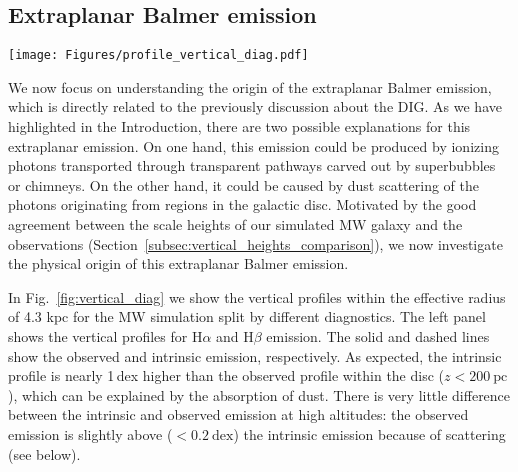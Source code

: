 \documentclass[fleqn,usenatbib]{mnras}
\begin{document}
\subsection{Extraplanar Balmer emission}
\label{subec:vertical_analysis}

\begin{figure*}
\begin{center}
\texttt{[image: Figures/profile\_vertical\_diag.pdf]}
\caption{Extraplanar Balmer emission of the MW simulation. From left to right, the vertical profiles of H$\alpha$ and H$\beta$, of H$\alpha$ split by DIG and  photons, of H$\alpha$ split by scattered and non-scattered photons, and H$\alpha$ split by radiative recombination and collisional excitation. The smaller panels on the bottom show the fractional contribution of the different components. All the vertical profiles are obtained within the effective radius of 4.3 kpc. The key message from this figure is that the Balmer emission at large scale heights ($z>200~\mathrm{pc}$) is mainly emitted in-situ via radiative recombination, emitted in low-density gas (i.e. the DIG), and scattering is significant but not dominant ($f_{\rm scat}\approx 20\%$).}
\label{fig:vertical_diag}
\end{center}
\end{figure*}

We now focus on understanding the origin of the extraplanar Balmer emission, which is directly related to the previously discussion about the DIG. As we have highlighted in the Introduction, there are two possible explanations for this extraplanar emission. On one hand, this emission could be produced by ionizing photons transported through transparent pathways carved out by superbubbles or chimneys. On the other hand, it could be caused by dust scattering of the photons originating from  regions in the galactic disc. Motivated by the good agreement between the scale heights of our simulated MW galaxy and the observations (Section~\ref{subsec:vertical_heights_comparison}), we now investigate the physical origin of this extraplanar Balmer emission.

In Fig.~\ref{fig:vertical_diag} we show the vertical profiles within the effective radius of 4.3 kpc for the MW simulation split by different diagnostics. The left panel shows the vertical profiles for H$\alpha$ and H$\beta$ emission. The solid and dashed lines show the observed and intrinsic emission, respectively. As expected, the intrinsic profile is nearly 1\,dex higher than the observed profile within the disc ($z<200~\mathrm{pc}$), which can be explained by the absorption of dust. There is very little difference between the intrinsic and observed emission at high altitudes: the observed emission is slightly above ($<0.2~\mathrm{dex}$) the intrinsic emission because of scattering (see below).
\end{document}
